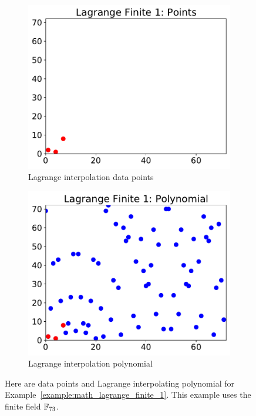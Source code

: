 \begin{figure}[t]
\centering
    \begin{subfigure}[t]{0.45\textwidth}
    \includegraphics[width=\textwidth]{plots/lagrange/lagrange_finite_points_1.pdf}
    \caption{Lagrange interpolation data points}
    \label{fig:lagrange_finite_points_1}
    \end{subfigure}
    \begin{subfigure}[t]{0.45\textwidth}
    \includegraphics[width=\textwidth]{plots/lagrange/lagrange_finite_poly_1.pdf}
    \caption{Lagrange interpolation polynomial}
    \label{fig:lagrange_finite_poly_1}
    \end{subfigure}
    \caption[Data points and Lagrange Interpolation over finite fields 1]{Here
        are data points and Lagrange interpolating polynomial
        for Example~\ref{example:math_lagrange_finite_1}.
        This example uses the \gls{finite field} $\mathbb{F}_{73}$.}
\end{figure}

